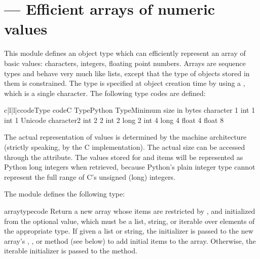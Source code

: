 \section{ ---
         Efficient arrays of numeric values}



This module defines an object type which can efficiently represent
an array of basic values: characters, integers, floating point
numbers.  Arrays are sequence types and behave very much
like lists, except that the type of objects stored in them is
constrained.  The type is specified at object creation time by using a
, which is a single character.  The following type
codes are defined:

\begin{tableiv}{c|l|l|c}{code}{Type code}{C Type}{Python Type}{Minimum size in bytes}
            {character}        {1}
     {int}              {1}
   {int}              {1}
      {Unicode character}{2}
    {int}              {2}
                {2}
      {int}              {2}
    {long}             {2}
     {int}              {4}
   {long}             {4}
           {float}            {4}
          {float}            {8}
\end{tableiv}

The actual representation of values is determined by the machine
architecture (strictly speaking, by the C implementation).  The actual
size can be accessed through the  attribute.  The values
stored  for  and  items will be represented as
Python long integers when retrieved, because Python's plain integer
type cannot represent the full range of C's unsigned (long) integers.


The module defines the following type:

\begin{funcdesc}{array}{typecode}
Return a new array whose items are restricted by ,
and initialized from the optional  value, which
must be a list, string, or iterable over elements of the
appropriate type.
If given a list or string, the initializer is passed to the
new array's , , or
 method (see below) to add initial items to
the array.  Otherwise, the iterable initializer is passed to the
 method.
\end{funcdesc}

